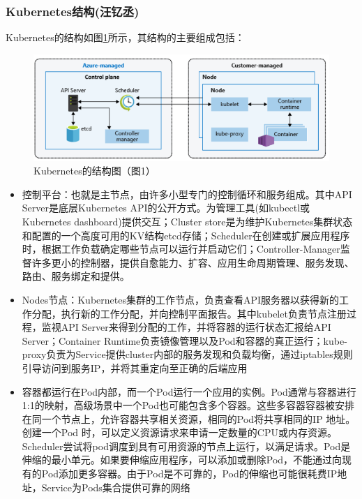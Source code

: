 \documentclass[11pt]{article}
\begin{document}
\subsubsection{Kubernetes结构(汪钇丞)}
Kubernetes的结构如图\ref{figs:Structure}所示，其结构的主要组成包括：
\begin{figure}[!htbp]
	\centering
	\includegraphics[scale=0.5]{figs/Kubernetes}
	\caption{Kubernetes的结构图（\cite{Kubernetes}图1）}
	\label{figs:Structure}
\end{figure}
\begin{itemize}
	\setlength{\itemsep}{0pt}
	\setlength{\parsep}{0pt}
	\setlength{\parskip}{0pt}
	\item 控制平台：也就是主节点，由许多小型专门的控制循环和服务组成。其中API Server是底层Kubernetes API的公开方式。为管理工具(如kubectl或Kubernetes dashboard)提供交互；Cluster store是为维护Kubernetes集群状态和配置的一个高度可用的KV结构etcd存储；Scheduler在创建或扩展应用程序时，根据工作负载确定哪些节点可以运行并启动它们；Controller-Manager监督许多更小的控制器，提供自愈能力、扩容、应用生命周期管理、服务发现、路由、服务绑定和提供。
	\item Nodes节点：Kubernetes集群的工作节点，负责查看API服务器以获得新的工作分配，执行新的工作分配，并向控制平面报告。其中kubelet负责节点注册过程，监视API Server来得到分配的工作，并将容器的运行状态汇报给API Server；Container Runtime负责镜像管理以及Pod和容器的真正运行；kube-proxy负责为Service提供cluster内部的服务发现和负载均衡，通过iptables规则引导访问到服务IP，并将其重定向至正确的后端应用
	\item 容器都运行在Pod内部，而一个Pod运行一个应用的实例。Pod通常与容器进行1:1的映射，高级场景中一个Pod也可能包含多个容器。这些多容器容器被安排在同一个节点上，允许容器共享相关资源，相同的Pod将共享相同的IP 地址。创建一个Pod 时，可以定义资源请求来申请一定数量的CPU或内存资源。Scheduler尝试将pod调度到具有可用资源的节点上运行，以满足请求。Pod是伸缩的最小单元。如果要伸缩应用程序，可以添加或删除Pod，不能通过向现有的Pod添加更多容器。由于Pod是不可靠的，Pod的伸缩也可能很耗费IP地址，Service为Pods集合提供可靠的网络
\end{itemize}
\end{document}
